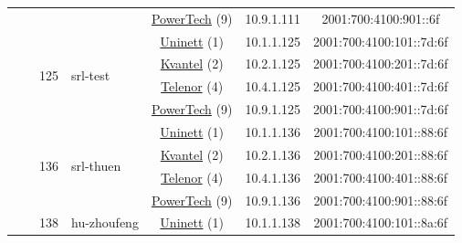 \begin{small}
\begin{center}
\begin{longtable}{|c|c|c|c|c|c|c|c|}
  &  & \multicolumn{2}{|c|}{} & \multicolumn{2}{|c|}{\tiny{\href{http://www.powertech.no}{PowerTech} (9)}} & \tiny{10.9.1.111} & \tiny{2001:700:4100:901::6f} \\* \cline{3-3}\cline{4-4}\cline{5-5}\cline{6-6}\cline{7-7}\cline{8-8}
  &  & \multirow{4}{*}{\tiny{125}} & \multicolumn{1}{|l|}{\multirow{4}{*}{\tiny{srl-test}}} & \multicolumn{2}{|c|}{\tiny{\href{https://www.uninett.no}{Uninett} (1)}} & \tiny{10.1.1.125} & \tiny{2001:700:4100:101::7d:6f} \\* \cline{5-5}\cline{6-6}\cline{7-7}\cline{8-8}
  &  &  &  & \multicolumn{2}{|c|}{\tiny{\href{http://kvantel.no}{Kvantel} (2)}} & \tiny{10.2.1.125} & \tiny{2001:700:4100:201::7d:6f} \\* \cline{5-5}\cline{6-6}\cline{7-7}\cline{8-8}
  &  &  &  & \multicolumn{2}{|c|}{\tiny{\href{https://www.telenor.no}{Telenor} (4)}} & \tiny{10.4.1.125} & \tiny{2001:700:4100:401::7d:6f} \\* \cline{5-5}\cline{6-6}\cline{7-7}\cline{8-8}
  &  &  &  & \multicolumn{2}{|c|}{\tiny{\href{http://www.powertech.no}{PowerTech} (9)}} & \tiny{10.9.1.125} & \tiny{2001:700:4100:901::7d:6f} \\* \cline{3-3}\cline{4-4}\cline{5-5}\cline{6-6}\cline{7-7}\cline{8-8}
  &  & \multirow{4}{*}{\tiny{136}} & \multicolumn{1}{|l|}{\multirow{4}{*}{\tiny{srl-thuen}}} & \multicolumn{2}{|c|}{\tiny{\href{https://www.uninett.no}{Uninett} (1)}} & \tiny{10.1.1.136} & \tiny{2001:700:4100:101::88:6f} \\* \cline{5-5}\cline{6-6}\cline{7-7}\cline{8-8}
  &  &  &  & \multicolumn{2}{|c|}{\tiny{\href{http://kvantel.no}{Kvantel} (2)}} & \tiny{10.2.1.136} & \tiny{2001:700:4100:201::88:6f} \\* \cline{5-5}\cline{6-6}\cline{7-7}\cline{8-8}
  &  &  &  & \multicolumn{2}{|c|}{\tiny{\href{https://www.telenor.no}{Telenor} (4)}} & \tiny{10.4.1.136} & \tiny{2001:700:4100:401::88:6f} \\* \cline{5-5}\cline{6-6}\cline{7-7}\cline{8-8}
  &  &  &  & \multicolumn{2}{|c|}{\tiny{\href{http://www.powertech.no}{PowerTech} (9)}} & \tiny{10.9.1.136} & \tiny{2001:700:4100:901::88:6f} \\* \cline{3-3}\cline{4-4}\cline{5-5}\cline{6-6}\cline{7-7}\cline{8-8}
  &  & \multirow{4}{*}{\tiny{138}} & \multicolumn{1}{|l|}{\multirow{4}{*}{\tiny{hu-zhoufeng}}} & \multicolumn{2}{|c|}{\tiny{\href{https://www.uninett.no}{Uninett} (1)}} & \tiny{10.1.1.138} & \tiny{2001:700:4100:101::8a:6f} \\* \cline{5-5}\cline{6-6}\cline{7-7}\cline{8-8}

\end{longtable}
\end{center}
\end{small}
